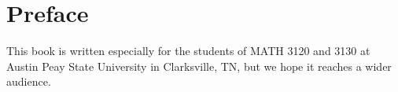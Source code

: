 \chapter*{Preface}

This book is written especially for the students of MATH 3120 and 3130 at Austin Peay State University in Clarksville, TN, but we hope it reaches a wider audience.
